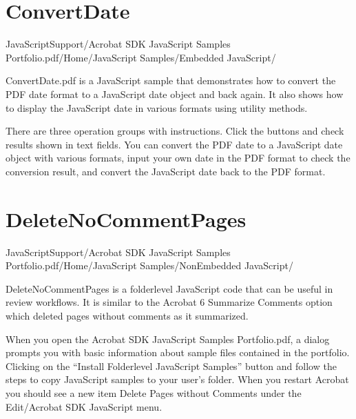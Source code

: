 \documentclass[letterpaper,12pt,english,openany,oneside]{sphinxmanual}
\begin{document}
\section{ConvertDate}
\label{\detokenize{Samples_JavaScript:convertdate}}\label{\detokenize{Samples_JavaScript:location-6}}

JavaScriptSupport/Acrobat SDK JavaScript Samples Portfolio.pdf/Home/JavaScript Samples/Embedded JavaScript/

\label{\detokenize{Samples_JavaScript:description-6}}

ConvertDate.pdf is a JavaScript sample that demonstrates how to convert the PDF date format to a JavaScript date object and back again. It also shows how to display the JavaScript date in various formats using utility methods.

\label{\detokenize{Samples_JavaScript:usage-3}}

There are three operation groups with instructions. Click the buttons and check results shown in text fields. You can convert the PDF date to a JavaScript date object with various formats, input your own date in the PDF format to check the conversion result, and convert the JavaScript date back to the PDF format.


\section{DeleteNoCommentPages}
\label{\detokenize{Samples_JavaScript:deletenocommentpages}}\label{\detokenize{Samples_JavaScript:location-7}}

JavaScriptSupport/Acrobat SDK JavaScript Samples Portfolio.pdf/Home/JavaScript Samples/Non\sphinxhyphen{}Embedded JavaScript/

\label{\detokenize{Samples_JavaScript:description-7}}

DeleteNoCommentPages is a folder\sphinxhyphen{}level JavaScript code that can be useful in review workflows. It is similar to the Acrobat 6 Summarize Comments option which deleted pages without comments as it summarized.

\label{\detokenize{Samples_JavaScript:usage-4}}

When you open the Acrobat SDK JavaScript Samples Portfolio.pdf, a dialog prompts you with basic information about sample files contained in the portfolio. Clicking on the “Install Folder\sphinxhyphen{}level JavaScript Samples” button and follow the steps to copy JavaScript samples to your user’s  folder. When you restart Acrobat you should see a new item Delete Pages without Comments under the Edit/Acrobat SDK JavaScript menu.
\end{document}
